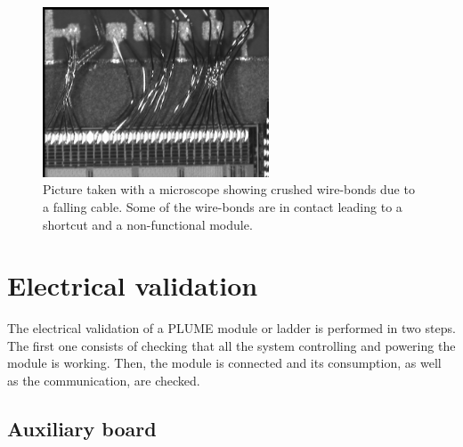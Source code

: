   \begin{figure}[!h]
    \centering
    \includegraphics[width=0.6\textwidth]{Pictures/labTests/crash_bonds.jpg}
    \caption{Picture taken with a microscope showing crushed wire-bonds due to a falling cable. Some of the wire-bonds are in contact leading to a shortcut and a non-functional module.}
    \label{fig:wireBondsCrashed}
  \end{figure}

\section{Electrical validation}

  The electrical validation of a \gls{PLUME} module or ladder is performed in two steps.
  The first one consists of checking that all the system controlling and powering the module is working. 
  Then, the module is connected and its consumption, as well as the communication, are checked.

  \subsection{Auxiliary board}

